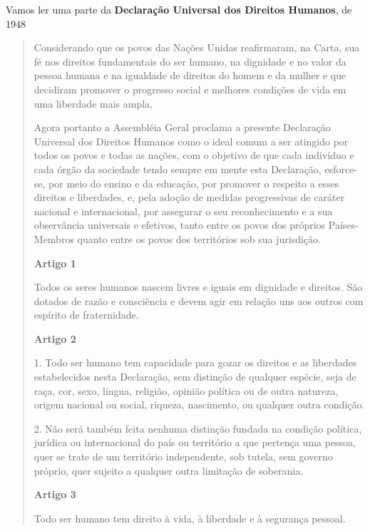 

Vamos ler uma parte da \textbf{Declaração Universal dos Direitos Humanos}, de 1948

\begin{quote}
Considerando que os povos das Nações Unidas reafirmaram, na Carta, sua
fé nos direitos fundamentais do ser humano, na dignidade e no valor da
pessoa humana e na igualdade de direitos do homem e da mulher e que
decidiram promover o progresso social e melhores condições de vida em
uma liberdade mais ampla,

Agora portanto a Assembléia Geral proclama a presente Declaração
Universal dos Direitos Humanos como o ideal comum a ser atingido por
todos os povos e todas as nações, com o objetivo de que cada indivíduo e
cada órgão da sociedade tendo sempre em mente esta Declaração,
esforce-se, por meio do ensino e da educação, por promover o respeito a
esses direitos e liberdades, e, pela adoção de medidas progressivas de
caráter nacional e internacional, por assegurar o seu reconhecimento e a
sua observância universais e efetivos, tanto entre os povos dos próprios
Países-Membros quanto entre os povos dos territórios sob sua jurisdição.

\textbf{Artigo 1}

Todos os seres humanos nascem livres e iguais em dignidade e direitos.
São dotados de razão e consciência e devem agir em relação uns aos
outros com espírito de fraternidade.

\textbf{Artigo 2}

1. Todo ser humano tem capacidade para gozar os direitos e as liberdades
estabelecidos nesta Declaração, sem distinção de qualquer espécie, seja
de raça, cor, sexo, língua, religião, opinião política ou de outra
natureza, origem nacional ou social, riqueza, nascimento, ou qualquer
outra condição.

2. Não será também feita nenhuma distinção fundada na condição política,
jurídica ou internacional do país ou território a que pertença uma
pessoa, quer se trate de um território independente, sob tutela, sem
governo próprio, quer sujeito a qualquer outra limitação de soberania.

\textbf{Artigo 3}

Todo ser humano tem direito à vida, à liberdade e à segurança pessoal.

\end{quote}

